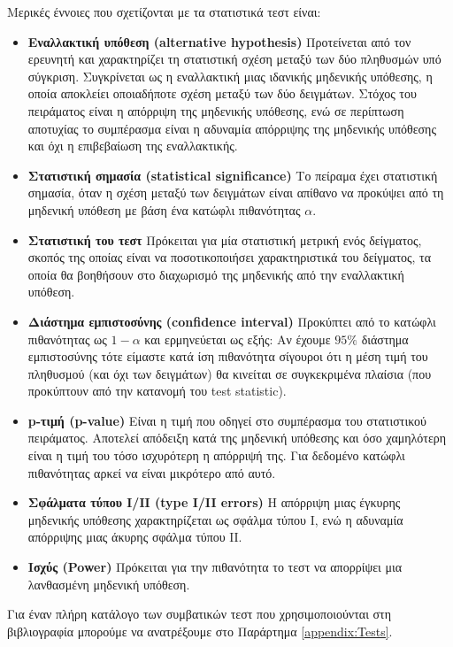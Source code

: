 Μερικές έννοιες που σχετίζονται με τα στατιστικά τεστ είναι:
\begin{itemize}
	\item \textbf{Εναλλακτική υπόθεση (alternative hypothesis)} Προτείνεται από τον ερευνητή και χαρακτηρίζει τη στατιστική σχέση μεταξύ των δύο πληθυσμών υπό σύγκριση. Συγκρίνεται ως η εναλλακτική μιας ιδανικής μηδενικής υπόθεσης, η οποία αποκλείει οποιαδήποτε σχέση μεταξύ των δύο δειγμάτων. Στόχος του πειράματος είναι η απόρριψη της μηδενικής υπόθεσης, ενώ σε περίπτωση αποτυχίας το συμπέρασμα είναι η αδυναμία απόρριψης της μηδενικής υπόθεσης και όχι η επιβεβαίωση της εναλλακτικής.
	\item \textbf{Στατιστική σημασία (statistical significance)} Το πείραμα έχει στατιστική σημασία, όταν η σχέση μεταξύ των δειγμάτων είναι απίθανο να προκύψει από τη μηδενική υπόθεση με βάση ένα κατώφλι πιθανότητας $\alpha$.
	\item \textbf{Στατιστική του τεστ} Πρόκειται για μία στατιστική μετρική ενός δείγματος, σκοπός της οποίας είναι να ποσοτικοποιήσει χαρακτηριστικά του δείγματος, τα οποία θα βοηθήσουν στο διαχωρισμό της μηδενικής από την εναλλακτική υπόθεση.
	\item \textbf{Διάστημα εμπιστοσύνης (confidence interval)}  Προκύπτει από το κατώφλι πιθανότητας ως $1-\alpha$ και ερμηνεύεται ως εξής: Αν έχουμε $95 \%$ διάστημα εμπιστοσύνης τότε είμαστε κατά ίση πιθανότητα σίγουροι ότι η μέση τιμή του πληθυσμού (και όχι των δειγμάτων) θα κινείται σε συγκεκριμένα πλαίσια (που προκύπτουν από την κατανομή του test statistic).
	\item \textbf{p-τιμή (p-value)} Είναι η τιμή που οδηγεί στο συμπέρασμα του στατιστικού πειράματος. Αποτελεί απόδειξη κατά της μηδενική υπόθεσης και όσο χαμηλότερη είναι η τιμή του τόσο ισχυρότερη η απόρριψή της. Για δεδομένο κατώφλι πιθανότητας αρκεί να είναι μικρότερο από αυτό.
	\item \textbf{Σφάλματα τύπου Ι/ΙΙ (type I/II errors)} Η απόρριψη μιας έγκυρης μηδενικής υπόθεσης χαρακτηρίζεται ως σφάλμα τύπου Ι, ενώ η αδυναμία απόρριψης μιας άκυρης σφάλμα τύπου ΙΙ.
	\item \textbf{Ισχύς (Power)} Πρόκειται για την πιθανότητα το τεστ να απορρίψει μια λανθασμένη μηδενική υπόθεση.
\end{itemize}

Για έναν πλήρη κατάλογο των συμβατικών τεστ που χρησιμοποιούνται στη βιβλιογραφία μπορούμε να ανατρέξουμε στο Παράρτημα \ref{appendix:Tests}.

